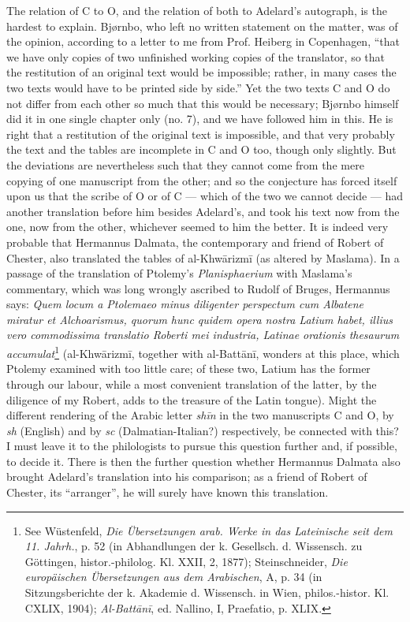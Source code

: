 \documentclass[11pt]{article}
\begin{document}
\par The relation of C to O, and the relation of both to Adelard's autograph, is the hardest to explain. Bjørnbo, who left no written statement on the matter, was of the opinion, according to a letter to me from Prof. Heiberg in Copenhagen, “that we have only copies of two unfinished working copies of the translator, so that the restitution of an original text would be impossible; rather, in many cases the two texts would have to be printed side by side.” Yet the two texts C and O do not differ from each other so much that this would be necessary; Bjørnbo himself did it in one single chapter only (no. 7), and we have followed him in this. He is right that a restitution of the original text is impossible, and that very probably the text and the tables are incomplete in C and O too, though only slightly. But the deviations are nevertheless such that they cannot come from the mere copying of one manuscript from the other; and so the conjecture has forced itself upon us that the scribe of O or of C — which of the two we cannot decide — had another translation before him besides Adelard's, and took his text now from the one, now from the other, whichever seemed to him the better. It is indeed very probable that Hermannus Dalmata, the contemporary and friend of Robert of Chester, also translated the tables of al-Khwārizmī (as altered by Maslama). In a passage of the translation of Ptolemy's \emph{Planisphaerium} with Maslama's commentary, which was long wrongly ascribed to Rudolf of Bruges, Hermannus says: \emph{Quem locum a Ptolemaeo minus diligenter perspectum cum Albatene miratur et Alchoarismus, quorum hunc quidem opera nostra Latium habet, illius vero commodissima translatio Roberti mei industria, Latinae orationis thesaurum accumulat}\footnote{See Wüstenfeld, \emph{Die Übersetzungen arab. Werke in das Lateinische seit dem 11. Jahrh.}, p. 52 (in Abhandlungen der k. Gesellsch. d. Wissensch. zu Göttingen, histor.-philolog. Kl. XXII, 2, 1877); Steinschneider, \emph{Die europäischen Übersetzungen aus dem Arabischen}, A, p. 34 (in Sitzungsberichte der k. Akademie d. Wissensch. in Wien, philos.-histor. Kl. CXLIX, 1904); \emph{Al-Battānī}, ed. Nallino, I, Praefatio, p. XLIX.} (al-Khwārizmī, together with al-Battānī, wonders at this place, which Ptolemy examined with too little care; of these two, Latium has the former through our labour, while a most convenient translation of the latter, by the diligence of my Robert, adds to the treasure of the Latin tongue). Might the different rendering of the Arabic letter \emph{shīn} in the two manuscripts C and O, by \emph{sh} (English) and by \emph{sc} (Dalmatian-Italian?) respectively, be connected with this? I must leave it to the philologists to pursue this question further and, if possible, to decide it. There is then the further question whether Hermannus Dalmata also brought Adelard's translation into his comparison; as a friend of Robert of Chester, its “arranger”, he will surely have known this translation.\par
\end{document}
